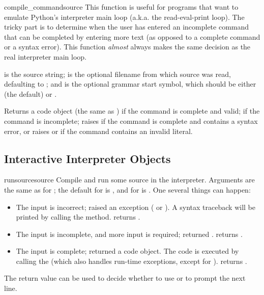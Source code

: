 \begin{funcdesc}{compile_command}{source}
This function is useful for programs that want to emulate Python's
interpreter main loop (a.k.a. the read-eval-print loop).  The tricky
part is to determine when the user has entered an incomplete command
that can be completed by entering more text (as opposed to a
complete command or a syntax error).  This function
\emph{almost} always makes the same decision as the real interpreter
main loop.

 is the source string;  is the optional
filename from which source was read, defaulting to ;
and  is the optional grammar start symbol, which should
be either  (the default) or .

Returns a code object (the same as ) if the command is complete and
valid;  if the command is incomplete; raises
 if the command is complete and contains a
syntax error, or raises  or
 if the command contains an invalid literal.
\end{funcdesc}


\subsection{Interactive Interpreter Objects
            \label{interpreter-objects}}

\begin{methoddesc}{runsource}{source}
Compile and run some source in the interpreter.
Arguments are the same as for ; the
default for  is , and for
 is .  One several things can happen:

\begin{itemize}
\item
The input is incorrect;  raised an
exception ( or ).  A
syntax traceback will be printed by calling the
 method.   returns
.

\item
The input is incomplete, and more input is required;
 returned .
 returns .

\item
The input is complete;  returned a code
object.  The code is executed by calling the  (which
also handles run-time exceptions, except for ).
 returns .
\end{itemize}

The return value can be used to decide whether to use
 or  to prompt the next line.
\end{methoddesc}

